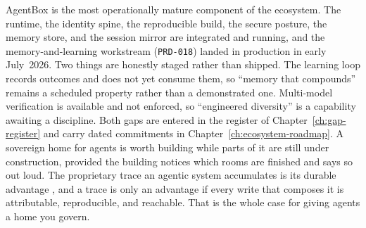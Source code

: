 AgentBox is the most operationally mature component of the ecosystem. The runtime, the identity spine, the reproducible build, the secure posture, the memory
store, and the session mirror are integrated and running, and the memory-and-learning workstream (\texttt{PRD-018}) landed in production in early July~2026. Two
things are honestly staged rather than shipped. The learning loop records outcomes and does not yet consume them, so ``memory that compounds'' remains a
scheduled property rather than a demonstrated one. Multi-model verification is available and not enforced, so ``engineered diversity'' is a capability awaiting
a discipline. Both gaps are entered in the register of Chapter~\ref{ch:gap-register} and carry dated commitments in Chapter~\ref{ch:ecosystem-roadmap}. A
sovereign home for agents is worth building while parts of it are still under construction, provided the building notices which rooms are finished and says so
out loud. The proprietary trace an agentic system accumulates is its durable advantage \parencite{Pereira2026Playbook}, and a trace is only an advantage if
every write that composes it is attributable, reproducible, and reachable. That is the whole case for giving agents a home you govern.
